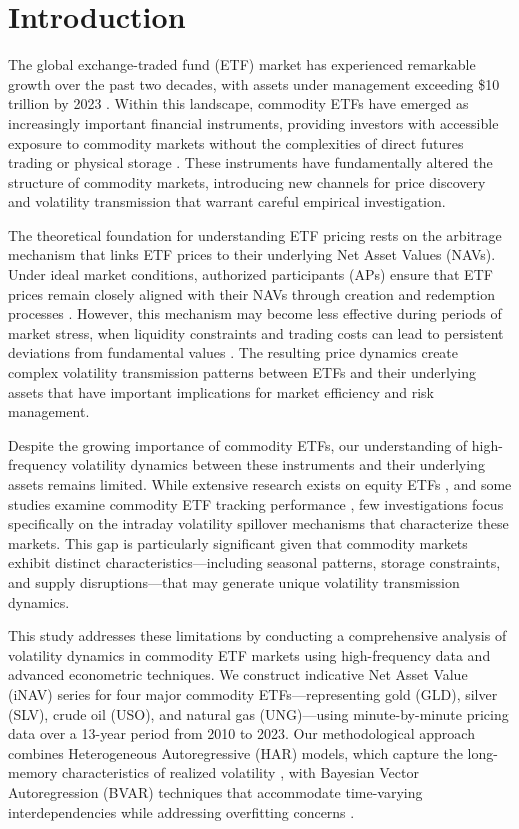 
\section{Introduction} 
The global exchange-traded fund (ETF) market has experienced remarkable growth over the past two decades, with assets under management exceeding \$10 trillion by 2023 \citep{petajisto2017inefficiencies}.  Within this landscape, commodity ETFs have emerged as increasingly important financial instruments, providing investors with accessible exposure to commodity markets without the complexities of direct futures trading or physical storage \citep{gorton2006facts}. These instruments have fundamentally altered the structure of commodity markets, introducing new channels for price discovery and volatility transmission that warrant careful empirical investigation.

The theoretical foundation for understanding ETF pricing rests on the arbitrage mechanism that links ETF prices to their underlying Net Asset Values (NAVs). Under ideal market conditions, authorized participants (APs) ensure that ETF prices remain closely aligned with their NAVs through creation and redemption processes \citep{ackert2000arbitrage}. However, this mechanism may become less effective during periods of market stress, when liquidity constraints and trading costs can lead to persistent deviations from fundamental values \citep{madhavan2012exchange}. The resulting price dynamics create complex volatility transmission patterns between ETFs and their underlying assets that have important implications for market efficiency and risk management.

Despite the growing importance of commodity ETFs, our understanding of high-frequency volatility dynamics between these instruments and their underlying assets remains limited. While extensive research exists on equity ETFs \citep{ben2018etfs, israeli2017etf}, and some studies examine commodity ETF tracking performance \citep{todorov2021etf}, few investigations focus specifically on the intraday volatility spillover mechanisms that characterize these markets. This gap is particularly significant given that commodity markets exhibit distinct characteristics—including seasonal patterns, storage constraints, and supply disruptions—that may generate unique volatility transmission dynamics.

This study addresses these limitations by conducting a comprehensive analysis of volatility dynamics in commodity ETF markets using high-frequency data and advanced econometric techniques. We construct indicative Net Asset Value (iNAV) series for four major commodity ETFs—representing gold (GLD), silver (SLV), crude oil (USO), and natural gas (UNG)—using minute-by-minute pricing data over a 13-year period from 2010 to 2023. Our methodological approach combines Heterogeneous Autoregressive (HAR) models, which capture the long-memory characteristics of realized volatility \citep{corsi2009simple}, with Bayesian Vector Autoregression (BVAR) techniques that accommodate time-varying interdependencies while addressing overfitting concerns \citep{koop2011forecasting}.

